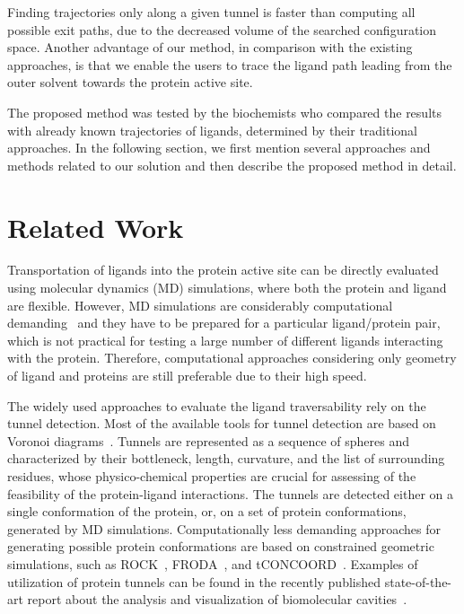 \documentclass[usletter, 10pt, conference]{ieeeconf} %
\begin{document}
Finding trajectories only along a given tunnel is faster than computing all possible exit paths, due to the decreased volume of the searched configuration space.
Another advantage of our method, in comparison with the existing approaches, is that we enable the users to trace the ligand path leading from the
outer solvent towards the protein active site.

The proposed method was tested by the biochemists who compared the results with already known trajectories of ligands, determined by their traditional approaches.
In the following section, we first mention several approaches and methods related to our solution and then describe the proposed method in detail.

\section{Related Work}
Transportation of ligands into the protein active site can be directly evaluated using molecular dynamics (MD) simulations, where both the protein and ligand are flexible.
However, MD simulations are considerably computational demanding~\cite{kingsley2014including} and they have to be prepared
for a particular ligand/protein pair, which is not practical for testing a large number of different ligands interacting with the protein.
Therefore, computational approaches considering only geometry of ligand and proteins are still preferable due to their high speed.

The widely used approaches to evaluate the ligand traversability rely on the tunnel detection.
Most of the available tools for tunnel detection are based on Voronoi diagrams~\cite{yaffe2008,caver3,sehnal2013mole}.
Tunnels are represented as a sequence of spheres and characterized by their bottleneck, length, curvature, and the list of surrounding residues, whose physico-chemical properties are crucial for assessing of the feasibility of the protein-ligand interactions.
The tunnels are detected either on a single conformation of the protein, or, on a set of protein conformations, generated by MD simulations.
Computationally less demanding approaches for generating possible protein conformations are based on constrained geometric simulations, such as
ROCK~\cite{lei2004sampling}, FRODA~\cite{wells2005constrained}, and tCONCOORD~\cite{seeliger2007geometry}.
Examples of utilization of protein tunnels can be found in the recently published state-of-the-art report about the analysis and visualization of biomolecular cavities~\cite{Krone_2016}.
\end{document}
